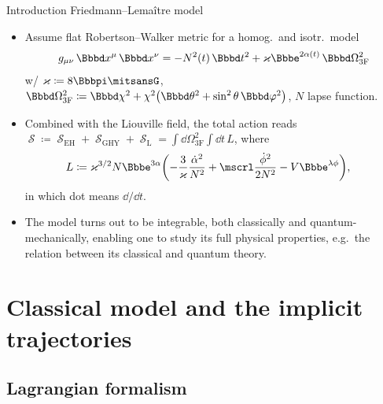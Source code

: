 \documentclass[9pt]{beamer}
\begin{document}
\begin{frame}%
{Introduction}%
{Friedmann--Lemaître model}
\begin{itemize}
\item Assume flat Robertson--Walker metric for a homog.\ and isotr.\ model
\begin{align}
g_{\mu\nu}\,\dd x^\mu\,\dd x^\nu = -\rfun{N^2}{t}\,\dd t^2 + \varkappa 
\ee^{2\rfun{\alpha}{t}}\,\dd\Omega_{3\text{F}}^2
\end{align}
w/ $\varkappa \coloneqq 8\pp\nG$, $\dd\Omega_{3\text{F}}^2 \coloneqq 
\dd\chi^2+\chi^2\rbr{\dd\theta^2+\sin^2\theta\,\dd\varphi^2}$, $N$
lapse function.

\item Combined with the Liouville field, the total action reads
$\mscrS \coloneqq \mscrS_{\text{EH}} + \mscrS_\text{GHY} + \mscrS_\text{L}
= \int\dd\Omega_{3\text{F}}^2\int\dd t\,L$, where
\begin{align}
L&\coloneqq \varkappa^{3/2}N\ee^{3\alpha}
\rbr{-\frac{3}{\varkappa}\frac{\dot{\alpha}^2}{N^2}
+\mscrl\frac{\dot{\phi}^2}{2N^2}-V\ee^{\lambda\phi}},
\label{eq:eff-lag-10}
\end{align}
in which dot means $\dd/\dd t$.

\item The model turns out to be integrable, both classically and 
quantum-mechanically, enabling one to study its full physical properties, e.g.\
the relation between its classical and quantum theory.
\end{itemize}
\end{frame}

\section{Classical model and the implicit trajectories}

\subsection{Lagrangian formalism}
\end{document}
